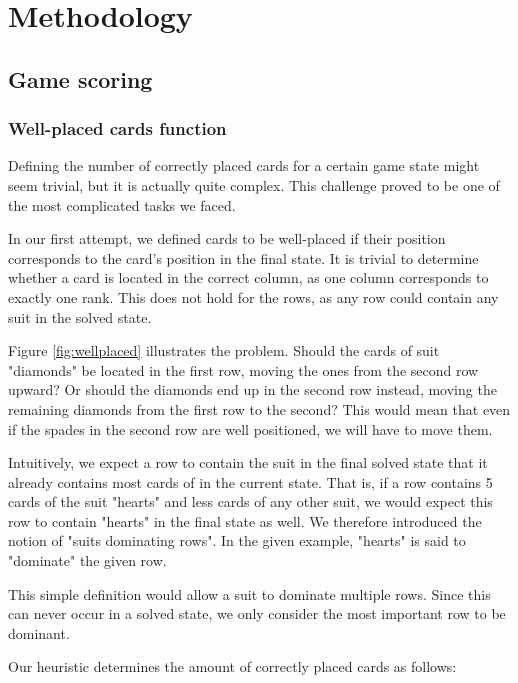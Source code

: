 \chapter{Methodology}
\section{Game scoring}
\subsection{Well-placed cards function} \label{ssec:wellplaced}
Defining the number of correctly placed cards for a certain game state might seem trivial, but it is actually quite complex. This challenge proved to be one of the most complicated tasks we faced.

In our first attempt, we defined cards to be well-placed if their position corresponds to the card's position in the final state.
It is trivial to determine whether a card is located in the correct column, as one column corresponds to exactly one rank.
This does not hold for the rows, as any row could contain any suit in the solved state.

Figure \ref{fig:wellplaced} illustrates the problem. Should the cards of suit "diamonds" be located in the first row, moving the ones from the second row upward? Or should the diamonds end up in the second row instead, moving the remaining diamonds from the first row to the second? This would mean that even if the spades in the second row are well positioned, we will have to move them.

Intuitively, we expect a row to contain the suit in the final solved state that it already contains most cards of in the current state.
That is, if a row contains 5 cards of the suit "hearts" and less cards of any other suit, we would expect this row to contain "hearts" in the final state as well.
We therefore introduced the notion of "suits dominating rows".
In the given example, "hearts" is said to "dominate" the given row.

This simple definition would allow a suit to dominate multiple rows.
Since this can never occur in a solved state, we only consider the most important row to be dominant. 

Our heuristic determines the amount of correctly placed cards as follows:

